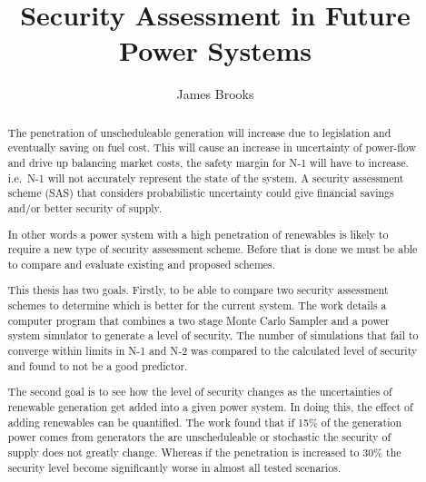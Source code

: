 \documentclass[a4paper,oneside,12pt]{report}
\newcommand{\frontmatter}{\cleardoublepage\pagenumbering{roman}}
\begin{document}
\frontmatter

\norestrictions
\author{James Brooks}
\title{Security Assessment in Future Power Systems}

\maketitle

\begin{abstract}

The penetration of unscheduleable generation will increase due to legislation and eventually saving on fuel cost. This will cause an increase in uncertainty of power-flow and drive up balancing market costs, the safety margin for N-1 will have to increase. i.e.\ N-1 will not accurately represent the state of the system. A security assessment scheme (SAS) that considers probabilistic uncertainty could give financial savings and/or better security of supply.

In other words a power system with a high penetration of renewables is likely to require a new type of security assessment scheme. Before that is done we must be able to compare and evaluate existing and proposed schemes.

This thesis has two goals. Firstly, to be able to compare two security assessment schemes to determine which is better for the current system. The work details a computer program that combines a two stage Monte Carlo Sampler and a power system simulator to generate a level of security. The number of simulations that fail to converge within limits in N-1 and N-2 was compared to the calculated level of security and found to not be a good predictor.

The second goal is to see how the level of security changes as the uncertainties of renewable generation get added into a given power system. In doing this, the effect of adding renewables can be quantified. The work found that if 15\% of the generation power comes from generators the are unscheduleable or stochastic the security of supply does not greatly change. Whereas if the penetration is increased to 30\% the security level become significantly worse in almost all tested scenarios. 

\end{abstract}
\end{document}
